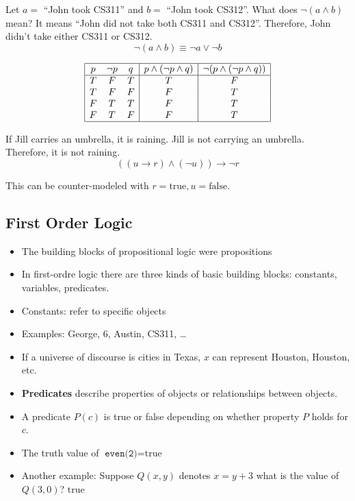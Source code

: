 \documentclass[8pt]{scrreprt}
\newcommand{\true}{\text{true}}
\newcommand{\false}{\text{false}}
\begin{document}
\begin{landscape}
\begin{multicols*}{3}
\begin{definition}
	Let $a=$ ``John took CS311'' and $b=$ ``John took CS312''. What does
	$\neg (a\land b)$ mean? It means ``John did not take both CS311 and CS312''.
	Therefore, John didn't take either CS311 or CS312.
	\[
		\neg(a\land b) \equiv \neg a\lor \neg b
	\]
\end{definition}

\begin{example}
	\[
		\begin{array}{|c c c|c|c|}
			\hline
			p & \neg p & q & p\land (\neg p\land q) & \neg (p\land (\neg p\land q)) \\
			\hline
			T & F      & T & T                      & F                             \\
			T & F      & F & F                      & T                             \\
			F & T      & T & F                      & T                             \\
			F & T      & F & F                      & T                             \\
			\hline
		\end{array}
	\]
\end{example}

\begin{example}
	If Jill carries an umbrella, it is raining. Jill is not carrying an umbrella. Therefore, it is not raining.
	\[
		((u\rightarrow r)\land (\neg u))\rightarrow \neg r
	\]

	This can be counter-modeled with $r=\true, u=\false$.
\end{example}

\subsection{First Order Logic}
\begin{itemize}
	\item The building blocks of propositional logic were propositions
	\item In first-ordre logic there are three kinds of basic building blocks:
	      constants, variables, predicates.
	\item Constants: refer to specific objects
	\item Examples: George, 6, Austin, CS311, \ldots
	\item If a universe of discourse is cities in Texas, $x$ can represent Houston,
	      Houston, etc.
	\item \textbf{Predicates} describe properties of objects or relationships between objects.
	\item A predicate $P(c)$ is true or false depending on whether property
	      $P$ holds for $c$.
	\item The truth value of $\texttt{even(2)} = \true$
	\item Another example: Suppose $Q(x, y)$ denotes $x=y+3$ what is the value of
	      $Q(3, 0)$? $\true$
\end{itemize}


\end{multicols*}
\end{landscape}
\end{document}
